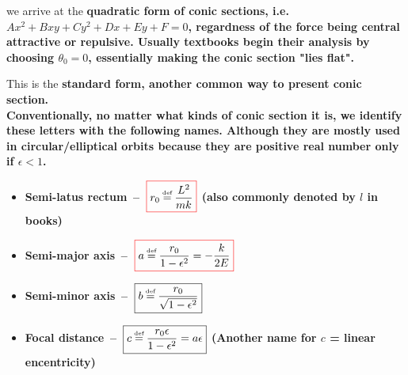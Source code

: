 \documentclass[class=article, crop=false, 12pt]{standalone}
\begin{document}
we arrive at the \bf{quadratic form} of conic sections, 
i.e. $Ax^2+Bxy+Cy^2+Dx+Ey+F=0$, 
regardness of the force being central attractive or repulsive.
Usually textbooks begin their analysis by choosing $\theta_0 = 0$, 
essentially making the conic section "lies flat".

This is the \bf{standard form}, another common way to present conic section.\\

Conventionally, no matter what kinds of conic section it is, 
we identify these letters with the following names.
Although they are mostly used in circular/elliptical orbits because they are positive real number only if $\epsilon<1$.

\begin{itemize}
    \item \bf{Semi-latus rectum} \,--\, $\cbox[red]{r_0 \defeq \frac{L^2}{mk}}$ \qquad (also commonly denoted by $l$ in books)
    \item \bf{Semi-major axis} \,--\, $\cbox[red]{a \defeq \frac{r_0}{1-\epsilon^2} = -\frac{k}{2E}}$
    \item \bf{Semi-minor axis} \,--\, $\boxed{b \defeq \frac{r_0}{\sqrt{1-\epsilon^2}}}$ 
    \item \bf{Focal distance} \,--\, $\boxed{c \defeq \frac{r_0\epsilon}{1-\epsilon^2} = a\epsilon}$ 
        \qquad\qquad  (Another name for $c$ = linear encentricity)
\end{itemize}
\end{document}
